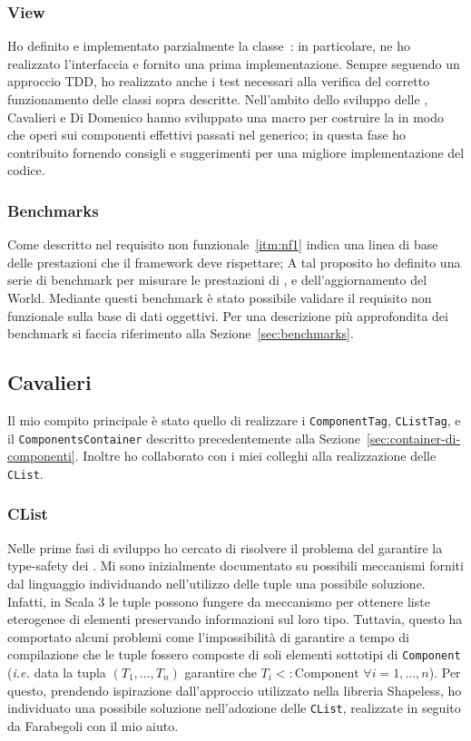 \subsubsection{View}
Ho definito e implementato parzialmente la classe~\View: in particolare, ne ho realizzato l'interfaccia e fornito una
prima implementazione.
Sempre seguendo un approccio TDD, ho realizzato anche i test necessari alla verifica del corretto funzionamento delle
classi sopra descritte.
Nell'ambito dello sviluppo delle \View, Cavalieri e Di Domenico hanno sviluppato una macro per costruire la
\View in modo che operi sui componenti effettivi passati nel generico;
in questa fase ho contribuito fornendo consigli e suggerimenti per una migliore implementazione del codice.

\subsubsection{Benchmarks}
Come descritto nel requisito non funzionale~\ref{itm:nf1} indica una linea di base delle prestazioni che il framework
deve rispettare;
A tal proposito ho definito una serie di benchmark per misurare le prestazioni di \View, \System e dell'aggiornamento
del World.
Mediante questi benchmark è stato possibile validare il requisito non funzionale sulla base di dati oggettivi.
Per una descrizione più approfondita dei benchmark si faccia riferimento alla Sezione~\ref{sec:benchmarks}.

\subsection{Cavalieri}\label{subsec:giacomo-cavalieri}
Il mio compito principale è stato quello di realizzare i \texttt{ComponentTag}, \texttt{CListTag},
e il \texttt{ComponentsContainer} descritto precedentemente alla Sezione~\ref{sec:container-di-componenti}.
Inoltre ho collaborato con i miei colleghi alla realizzazione delle \texttt{CList}.

\subsubsection{CList}
Nelle prime fasi di sviluppo ho cercato di risolvere il problema del garantire la type-safety dei \System.
Mi sono inizialmente documentato su possibili meccanismi forniti dal linguaggio individuando nell'utilizzo delle
tuple una possibile soluzione.
Infatti, in Scala 3 le tuple possono fungere da meccanismo per ottenere liste eterogenee di elementi
preservando informazioni sul loro tipo\cite{tuples}.
Tuttavia, questo ha comportato alcuni problemi come l'impossibilità di garantire a tempo di compilazione che le tuple
fossero composte di soli elementi sottotipi di \texttt{Component}
(\textit{i.e.} data la tupla $(T_1,\dots,T_n)$ garantire che $T_i <: \text{Component } \forall i=1,\dots,n$).
Per questo, prendendo ispirazione dall'approccio utilizzato nella libreria Shapeless\cite{shapeless},
ho individuato una possibile soluzione nell'adozione delle \texttt{CList}, realizzate in seguito
da Farabegoli con il mio aiuto.

